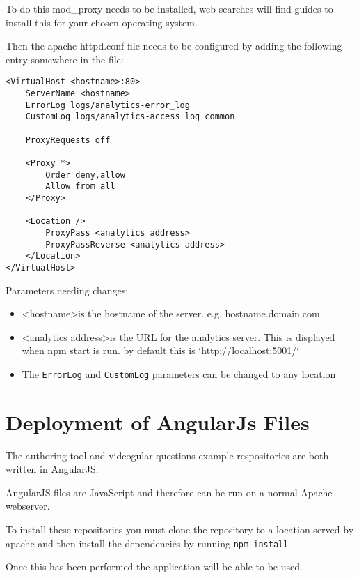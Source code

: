 To do this mod\_proxy needs to be installed, web searches will find guides to install this for your chosen operating system.

Then the apache httpd.conf file needs to be configured by adding the following entry somewhere in the file:

\begin{lstlisting}[caption={Apache configuration}, label={code:apacheConfig_nodejs}]
<VirtualHost <hostname>:80>
	ServerName <hostname>
	ErrorLog logs/analytics-error_log
	CustomLog logs/analytics-access_log common

	ProxyRequests off
	
	<Proxy *>
		Order deny,allow
		Allow from all
	</Proxy>

	<Location />
		ProxyPass <analytics address>
		ProxyPassReverse <analytics address>
	</Location>
</VirtualHost>
\end{lstlisting}

Parameters needing changes:

\begin{itemize}
\item \textless hostname\textgreater is the hostname of the server. e.g. hostname.domain.com
\item \textless analytics address\textgreater is the URL for the analytics server. This is displayed when npm start is run. by default this is `http://localhost:5001/`
\item The \lstinline|ErrorLog| and \lstinline|CustomLog| parameters can be changed to any location
\end{itemize}

\section{Deployment of AngularJs Files} \label{Section:Deployment of AngularJs Files}

The authoring tool and videogular questions example respositories are both written in AngularJS.

AngularJS files are JavaScript and therefore can be run on a normal Apache webserver.

To install these repositories you must clone the repository to a location served by apache and then install the dependencies by running \lstinline|npm install|

Once this has been performed the application will be able to be used.